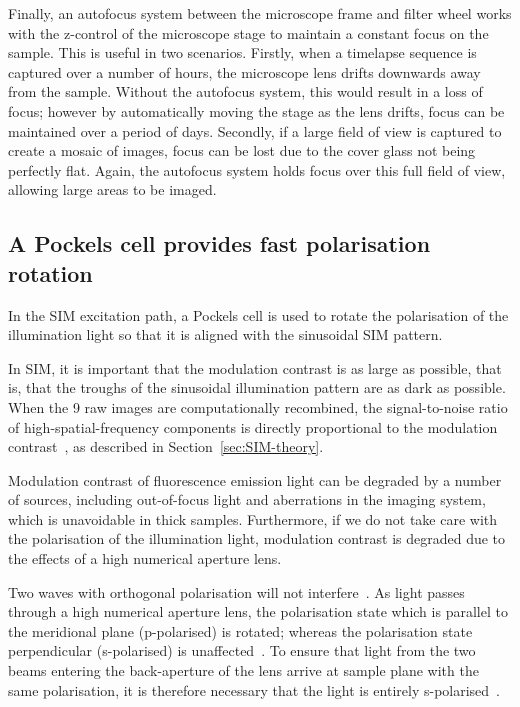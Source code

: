 Finally, an autofocus system between the microscope frame and filter wheel works with the z-control of the microscope stage to maintain a constant focus on the sample. 
This is useful in two scenarios. 
Firstly, when a timelapse sequence is captured over a number of hours, the microscope lens drifts downwards away from the sample. 
Without the autofocus system, this would result in a loss of focus; however by automatically moving the stage as the lens drifts, focus can be maintained over a period of days.
Secondly, if a large field of view is captured to create a mosaic of images, focus can be lost due to the cover glass not being perfectly flat. 
Again, the autofocus system holds focus over this full field of view, allowing large areas to be imaged. 


\subsection{A Pockels cell provides fast polarisation rotation} \label{sec:lagsim-pockels}
In the SIM excitation path, a Pockels cell is used to rotate the polarisation of the illumination light so that it is aligned with the sinusoidal SIM pattern. 

In SIM, it is important that the modulation contrast is as large as possible, that is, that the troughs of the sinusoidal illumination pattern are as dark as possible.
When the 9 raw images are computationally recombined, the signal-to-noise ratio of high-spatial-frequency components is directly proportional to the modulation contrast~\cite{oholleran2012polarization}, as described in Section~\ref{sec:SIM-theory}. 

Modulation contrast of fluorescence emission light can be degraded by a number of sources, including out-of-focus light and aberrations in the imaging system, which is unavoidable in thick samples. 
Furthermore, if we do not take care with the polarisation of the illumination light,  modulation contrast is degraded due to the effects of a high numerical aperture lens. 

Two waves with orthogonal polarisation will not interfere~\cite{nityananda2013interference}. 
As light passes through a high numerical aperture lens, the polarisation state which is parallel to the meridional plane (p-polarised) is rotated; whereas the polarisation state perpendicular (s-polarised) is unaffected~\cite{mansuripur1991effects}. 
To ensure that light from the two beams entering the back-aperture of the lens arrive at sample plane with the same polarisation, it is therefore necessary that the light is entirely s-polarised~\cite{oholleran2012polarization}. 


